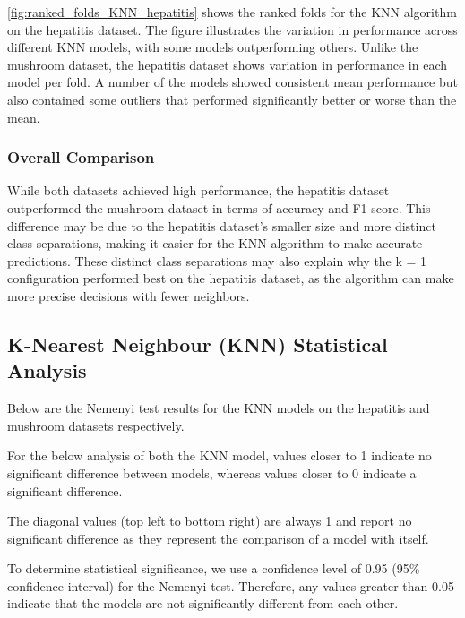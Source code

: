 \autoref{fig:ranked_folds_KNN_hepatitis} shows the ranked folds for the KNN algorithm on the hepatitis dataset.
The figure illustrates the variation in performance across different KNN models, with some models outperforming others.
Unlike the mushroom dataset, the hepatitis dataset shows variation in performance in each model per fold.
A number of the models showed consistent mean performance but also contained some outliers that performed significantly better or worse
than the mean.


\subsubsection{Overall Comparison}
While both datasets achieved high performance, the hepatitis dataset outperformed the mushroom dataset in terms of accuracy and F1 score.
This difference may be due to the hepatitis dataset's smaller size and more distinct class separations,
making it easier for the KNN algorithm to make accurate predictions. These distinct class separations may also explain why the k = 1 configuration
performed best on the hepatitis dataset, as the algorithm can make more precise decisions with fewer neighbors.

\subsection*{K-Nearest Neighbour (KNN) Statistical Analysis}
Below are the Nemenyi test results for the KNN models on the hepatitis and mushroom datasets respectively.

For the below analysis of both the KNN model, values closer to 1 indicate no significant difference between models,
whereas values closer to 0 indicate a significant difference.

The diagonal values (top left to bottom right) are always 1 and report no significant difference
as they represent the comparison of a model with itself.

To determine statistical significance, we use a confidence level of 0.95 (95\% confidence interval) for the Nemenyi test.
Therefore, any values greater than 0.05 indicate that the models are not significantly different from each other.

